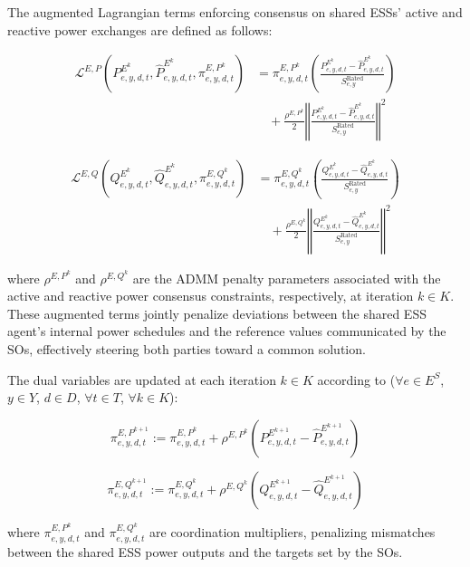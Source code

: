 \documentclass[preprint,12pt]{elsarticle}
\begin{document}
The augmented Lagrangian terms enforcing consensus on shared ESSs' active and reactive power exchanges are defined as follows:

\begin{align}
    \mathcal{L}^{E,P}\left(P^{E^k}_{e,y,d,t}, \hat{P}^{E^k}_{e,y,d,t}, \pi^{{E,P}^k}_{e,y,d,t} \right)
    &= \pi^{{E,P}^k}_{e,y,d,t} \left( \frac{P^{E^k}_{e,y,d,t} - \hat{P}^{E^k}_{e,y,d,t}}{S^\text{Rated}_{e,y}} \right) \\
    &\quad + \frac{\rho^{{E,P}^k}}{2} \left\Vert \frac{P^{E^k}_{e,y,d,t} - \hat{P}^{E^k}_{e,y,d,t}}{S^\text{Rated}_{e,y}} \right\Vert^2
\end{align}

\begin{align}
    \mathcal{L}^{E,Q}\left(Q^{E^k}_{e,y,d,t}, \hat{Q}^{E^k}_{e,y,d,t}, \pi^{{E,Q}^k}_{e,y,d,t} \right)
    &= \pi^{{E,Q}^k}_{e,y,d,t} \left( \frac{Q^{E^k}_{e,y,d,t} - \hat{Q}^{E^k}_{e,y,d,t}}{S^\text{Rated}_{e,y}} \right) \\
    &\quad + \frac{\rho^{{E,Q}^k}}{2} \left\Vert \frac{Q^{E^k}_{e,y,d,t} - \hat{Q}^{E^k}_{e,y,d,t}}{S^\text{Rated}_{e,y}} \right\Vert^2
\end{align}

\noindent
where $\rho^{{E,P}^k}$ and $\rho^{{E,Q}^k}$ are the ADMM penalty parameters associated with the active and reactive power consensus constraints, respectively, at iteration $k \in K$.
These augmented terms jointly penalize deviations between the shared ESS agent's internal power schedules and the reference values communicated by the SOs, effectively steering both parties toward a common solution.

The dual variables are updated at each iteration $k \in K$ according to ($\forall e \in E^S$, $y \in Y$, $d \in D$, $\forall t \in T$, $\forall k \in K$):

\begin{equation}
    \pi^{{E,P}^{k+1}}_{e,y,d,t} :=
    \pi^{{E,P}^{k}}_{e,y,d,t} + 
    \rho^{{E,P}^k} 
    \left(
        P^{E^{k+1}}_{e,y,d,t} - \hat{P}^{E^{k+1}}_{e,y,d,t}
    \right)
\end{equation}

\begin{equation}
    \pi^{{E,Q}^{k+1}}_{e,y,d,t} :=
    \pi^{{E,Q}^{k}}_{e,y,d,t} + 
    \rho^{{E,Q}^k} 
    \left(
        Q^{E^{k+1}}_{e,y,d,t} - \hat{Q}^{E^{k+1}}_{e,y,d,t}
    \right)
\end{equation}

\noindent
where $\pi^{{E,P}^{k}}_{e,y,d,t}$ and $\pi^{{E,Q}^{k}}_{e,y,d,t}$ are coordination multipliers, penalizing mismatches between the shared ESS power outputs and the targets set by the SOs.
\end{document}
